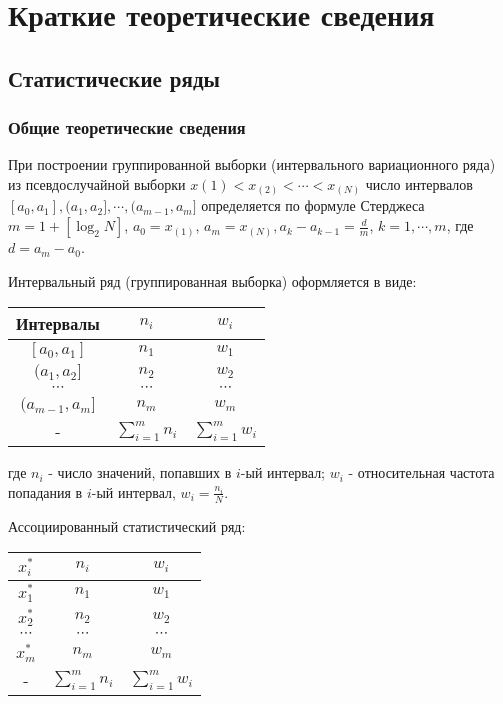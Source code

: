 \section{Краткие теоретические сведения}
\subsection{Статистические ряды}
\subsubsection{Общие теоретические сведения}
При построении группированной выборки (интервального вариационного ряда) из псевдослучайной выборки $x{(1)} < x_{(2)} < \cdots < x_{(N)}$ число интервалов 
$[a_0, a_1], (a_1, a_2], \cdots, (a_{m-1}, a_m]$ определяется по формуле Стерджеса 
$
m = 1 + [\log_2 N]
$,
$a_0 = x_{(1)}$, $a_m = x_{(N)}, a_k - a_{k-1} = \frac{d}{m}$, $k = 1, \cdots, m$, где $d = a_m - a_0$. 

Интервальный ряд (группированная выборка) оформляется в виде:
\begin{tabular}{|c|c|c|}
\hline
    Интервалы & $n_i$ & $w_i$  \\
    \hline
    $[a_0, a_1]$ & $n_1$ & $w_1$\\
    \hline
    $(a_1, a_2]$ & $n_2$ & $w_2$\\
    \hline
    $\cdots$ & $\cdots$ & $\cdots$\\
    \hline
    $(a_{m-1}, a_m]$ & $n_m$ & $w_m$\\
    \hline 
    - & $\sum\limits_{i=1}^mn_i$ & $\sum\limits_{i=1}^mw_i$\\
    \hline
\end{tabular}

где $n_i$ - число значений, попавших в $i$-ый интервал; $w_i$ - относительная частота попадания в 
$i$-ый интервал, $w_i = \frac{n_i}{N}$.

\newpage

Ассоциированный статистический ряд:
    \begin{tabular}{|c|c|c|}
    \hline
        $x_i^*$ & $n_i$ & $w_i$  \\
        \hline
        $x_1^*$ & $n_1$ & $w_1$\\
        \hline
        $x_2^*$ & $n_2$ & $w_2$\\
        \hline
        $\cdots$ & $\cdots$ & $\cdots$\\
        \hline
        $x_m^*$ & $n_m$ & $w_m$\\
        \hline 
        - & $\sum\limits_{i=1}^mn_i$ & $\sum\limits_{i=1}^mw_i$\\
        \hline
    \end{tabular}


